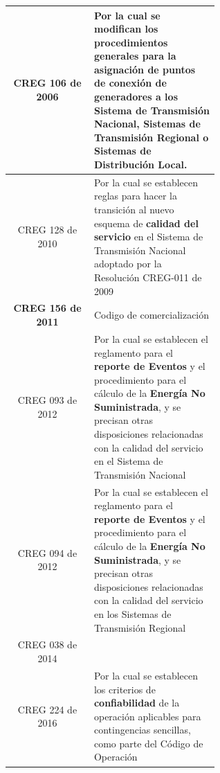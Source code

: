 \documentclass[a5paper]{book}%
\begin{document}
\begin{longtable}{|c|p{0.6\linewidth}|}
CREG 106 de 2006&Por la cual se modifican los procedimientos generales para la
                  asignación de\textbf{ puntos de conexión de
                  generadores} a los Sistema de Transmisión Nacional,
                  Sistemas de Transmisión Regional o Sistemas de
                  Distribución Local.\\\hline
  

  
CREG 128 de 2010& Por la cual se establecen reglas para hacer la transición al nuevo esquema de
\textbf{calidad del servicio} en el Sistema de Transmisión Nacional adoptado por la
                  Resolución CREG-011 de 2009\\\hline

\textbf{CREG 156 de 2011}& Codigo de comercialización \\\hline
  
CREG 093 de 2012& Por la cual se establecen el reglamento para el \textbf{reporte de Eventos }y el procedimiento
para el cálculo de la \textbf{Energía No Suministrada}, y se precisan otras disposiciones relacionadas con la calidad del servicio en el Sistema de Transmisión Nacional\\\hline
  
CREG 094 de 2012& Por la cual se establecen el reglamento para el \textbf{reporte de Eventos} y el procedimiento para el cálculo de la \textbf{Energía No Suministrada}, y se precisan
                  otras disposiciones relacionadas con la calidad del servicio en los Sistemas de Transmisión Regional\\\hline
  
CREG 038 de 2014& \\\hline  
CREG 224 de 2016& Por la cual se establecen los criterios de
                  \textbf{confiabilidad} de la operación aplicables
                  para contingencias sencillas, como parte del Código
                  de Operación\\\hline


\end{longtable}
\end{document}

